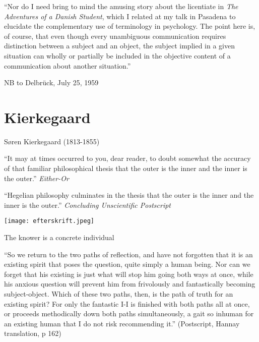 \documentclass[ignorenonframetext, ]{beamer}
\begin{document}
\begin{frame}

    ``Nor do I need bring to mind the amusing story about the
    licentiate in \emph{The Adventures of a Danish Student}, which I
    related at my talk in Pasadena to elucidate the complementary use
    of terminology in psychology. The point here is, of course, that
    even though every unambiguous communication requires distinction
    between a subject and an object, the subject implied in a given
    situation can wholly or partially be included in the objective
    content of a communication about another situation.''

    \medskip NB to Delbr{\"u}ck, July 25, 1959

\end{frame}

\section{Kierkegaard}

\begin{frame}{Søren Kierkegaard (1813-1855)}

  ``It may at times occurred to you, dear reader, to doubt somewhat
  the accuracy of that familiar philosophical thesis that the outer is
  the inner and the inner is the outer.'' \newline \emph{Either-Or}

  \vfill ``Hegelian philosophy culminates in the thesis that the outer
  is the inner and the inner is the outer.'' \newline \emph{Concluding
    Unscientific Postscript}


\end{frame}



\begin{frame}

  \texttt{[image: efterskrift.jpeg]}


\end{frame}

\begin{frame}{The knower is a concrete individual}

  ``So we return to the two paths of reflection, and have not
  forgotten that it is an existing spirit that poses the question,
  quite simply a human being. Nor can we forget that his existing is
  just what will stop him going both ways at once, while his anxious
  question will prevent him from frivolously and fantastically
  becoming subject-object. Which of these two paths, then, is the path
  of truth for an existing spirit? For only the fantastic I-I is
  finished with both paths all at once, or proceeds methodically down
  both paths simultaneously, a gait so inhuman for an existing human
  that I do not risk recommending it.'' (Postscript, Hannay
  translation, p 162)


\end{frame}
\end{document}
